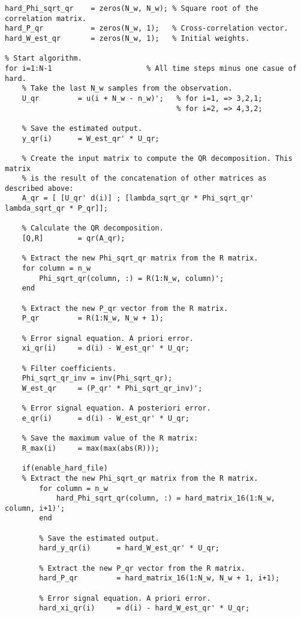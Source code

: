 \begin{lstlisting}[style=C]
hard_Phi_sqrt_qr    = zeros(N_w, N_w); % Square root of the correlation matrix.
hard_P_qr           = zeros(N_w, 1);   % Cross-correlation vector.
hard_W_est_qr       = zeros(N_w, 1);   % Initial weights.

% Start algorithm.
for i=1:N-1                      % All time steps minus one casue of hard.
    % Take the last N_w samples from the observation.
    U_qr         = u(i + N_w - n_w)';   % for i=1, => 3,2,1; 
                                        % for i=2, => 4,3,2;

    % Save the estimated output.
    y_qr(i)      = W_est_qr' * U_qr;
    
    % Create the input matrix to compute the QR decomposition. This matrix
    % is the result of the concatenation of other matrices as described above:
    A_qr = [ [U_qr' d(i)] ; [lambda_sqrt_qr * Phi_sqrt_qr' lambda_sqrt_qr * P_qr]];

    % Calculate the QR decomposition.
    [Q,R]        = qr(A_qr);

    % Extract the new Phi_sqrt_qr matrix from the R matrix.
    for column = n_w
        Phi_sqrt_qr(column, :) = R(1:N_w, column)';
    end

    % Extract the new P_qr vector from the R matrix.
    P_qr         = R(1:N_w, N_w + 1);

    % Error signal equation. A priori error.
    xi_qr(i)     = d(i) - W_est_qr' * U_qr;

    % Filter coefficients. 
    Phi_sqrt_qr_inv = inv(Phi_sqrt_qr);
    W_est_qr     = (P_qr' * Phi_sqrt_qr_inv)';

    % Error signal equation. A posteriori error.
    e_qr(i)      = d(i) - W_est_qr' * U_qr;

    % Save the maximum value of the R matrix:
    R_max(i)     = max(max(abs(R)));

    if(enable_hard_file)
    % Extract the new Phi_sqrt_qr matrix from the R matrix.
        for column = n_w
            hard_Phi_sqrt_qr(column, :) = hard_matrix_16(1:N_w, column, i+1)';
        end

        % Save the estimated output.
        hard_y_qr(i)      = hard_W_est_qr' * U_qr;
    
        % Extract the new P_qr vector from the R matrix.
        hard_P_qr         = hard_matrix_16(1:N_w, N_w + 1, i+1);
    
        % Error signal equation. A priori error.
        hard_xi_qr(i)     = d(i) - hard_W_est_qr' * U_qr;
    

\end{lstlisting}
